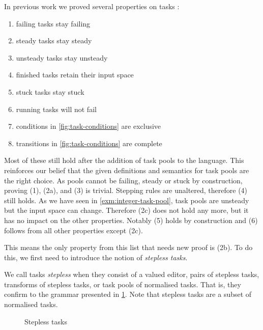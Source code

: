 In previous work we proved several properties on tasks \cite{conf/sfp/KlijnsmaS22,Steenvoorden22}:
\begin{enumerate}
  \item[(1)] failing tasks stay failing
  \item[(2a)] steady tasks stay steady
  \item[(2b)] unsteady tasks stay unsteady
  \item[(2c)] finished tasks retain their input space
  \item[(3)] stuck tasks stay stuck
  \item[(4)] running tasks will not fail
  \item[(5)] conditions in \cref{fig:task-conditions} are exclusive
  \item[(6)] transitions in \cref{fig:task-conditions} are complete
\end{enumerate}
Most of these still hold after the addition of task pools to the language.
This reinforces our belief that the given definitions and semantics for task pools are the right choice.
As pools cannot be failing, steady or stuck by construction,
proving (1), (2a), and (3) is trivial.
Stepping rules are unaltered, therefore (4) still holds.
As we have seen in \cref{exm:integer-task-pool},
task pools are unsteady but the input space can change.
Therefore (2c) does not hold any more,
but it has no impact on the other properties.
Notably (5) holds by construction and (6) follows from all other properties except (2c).

This means the only property from this list that needs new proof is (2b).
To do this, we first need to introduce the notion of \emph{stepless tasks}.

\begin{definition}
  \label{def:stepless-task}
  We call tasks \emph{stepless} when they consist of
  a valued editor,
  pairs of stepless tasks,
  transforms of stepless tasks,
  or task pools of normalised tasks.
  That is, they confirm to the grammar presented in \cref{fig:stepless-tasks-grammar}.
  Note that stepless tasks are a subset of normalised tasks.
\end{definition}

\begin{figure}
  \label{fig:stepless-tasks-grammar}
  \caption{Stepless tasks}
\end{figure}

